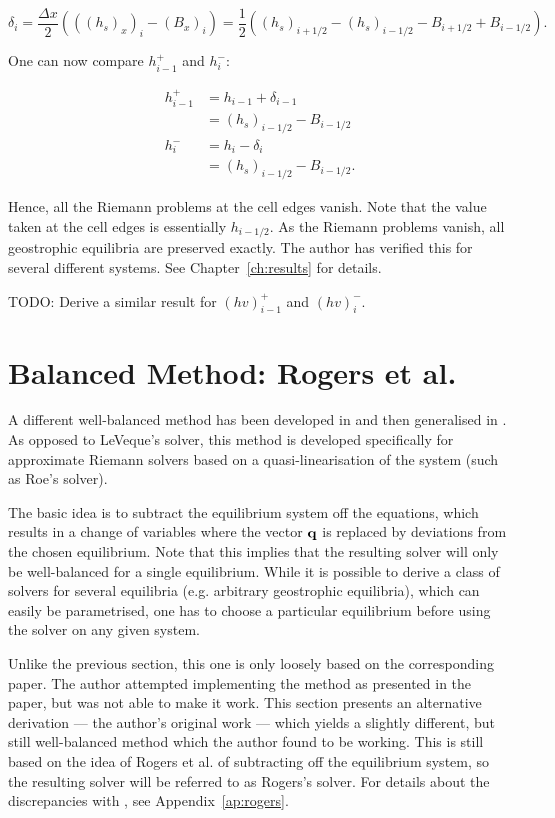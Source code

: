 \begin{equation}
  \delta_i = \frac{\Delta x}{2}(((h_s)_x)_i-(B_x)_i) = \frac{1}{2}((h_s)_{i+1/2}-(h_s)_{i-1/2}-B_{i+1/2}+B_{i-1/2}).
\end{equation}

One can now compare $h_{i-1}^+$ and $h_i^-$:

\begin{align}
  h_{i-1}^+ &= h_{i-1} + \delta_{i-1} \\
  &= (h_s)_{i-1/2} - B_{i-1/2} \\
  h_{i}^- &= h_{i} - \delta_{i} \\
  &= (h_s)_{i-1/2} - B_{i-1/2}.
\end{align}

Hence, all the Riemann problems at the cell edges vanish. Note that the value taken at the cell edges is essentially $h_{i-1/2}$. As the Riemann problems vanish, all geostrophic equilibria are preserved exactly. The author has verified this for several different systems. See Chapter~\ref{ch:results} for details.

TODO: Derive a similar result for $(hv)_{i-1}^+$ and $(hv)_i^-$.

\section{Balanced Method: Rogers et al.}

A different well-balanced method has been developed in \citet{rogers2001adaptive} and then generalised in \citet{rogers2003mathematical}. As opposed to LeVeque's solver, this method is developed specifically for approximate Riemann solvers based on a quasi-linearisation of the system (such as Roe's solver).

The basic idea is to subtract the equilibrium system off the equations, which results in a change of variables where the vector $\vb q$ is replaced by deviations from the chosen equilibrium. Note that this implies that the resulting solver will only be well-balanced for a single equilibrium. While it is possible to derive a class of solvers for several equilibria (e.g. arbitrary geostrophic equilibria), which can easily be parametrised, one has to choose a particular equilibrium before using the solver on any given system.

Unlike the previous section, this one is only loosely based on the corresponding paper. The author attempted implementing the method as presented in the paper, but was not able to make it work. This section presents an alternative derivation --- the author's original work --- which yields a slightly different, but still well-balanced method which the author found to be working. This is still based on the idea of Rogers et al. of subtracting off the equilibrium system, so the resulting solver will be referred to as Rogers's solver. For details about the discrepancies with \citet{rogers2003mathematical}, see Appendix~\ref{ap:rogers}.

